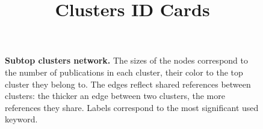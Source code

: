 \documentclass[a4paper,11pt]{report}
\title{{\bf Clusters ID Cards}}
\date{\begin{flushleft}This document gathers the ``ID Cards'' of the BC clusters found within the studied database.\\
 The BC network was built by linking pairs of publications based on the references they share - 9 out of 56 publications are in the network. The 4 clusters presented here correspond to the ones found in the subtop level grouping at least 0 publications. They gather a total of 9 publications. \\
 These ID cards displays the most frequent keywords, subject categories, journals of publication, institutions, countries, authors, references and reference journals of the publications of each cluster. The significance of an item $\sigma = \sqrt{N} (f - p) / \sqrt{p(1-p)}$ - where $N$ is the number of publications within the cluster and $f$ and $p$ are the proportion of publications respectively within the cluster and within the database displaying that item - is also given.\\
\vspace{1cm}
\copyright Sebastian Grauwin - BIBLIOTOOLS/BiblioTools3.2 (October 2017) \end{flushleft}}
\begin{document}
\begin{landscape}
\maketitle


\clearpage

\begin{figure}[h!]
\begin{center}
\caption{{\bf Subtop clusters network.} The sizes of the nodes correspond to the number of publications in each cluster, their color to the top cluster they belong to. The edges reflect shared references between clusters: the thicker an edge between two clusters, the more references they share. Labels correspond to the most significant used keyword. }
\end{center}
\end{figure}



\clearpage


\end{landscape}
\end{document}

